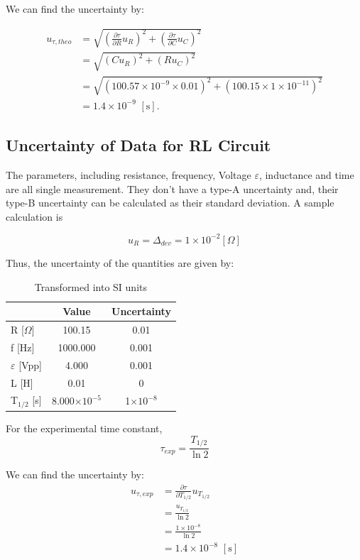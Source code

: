 \documentclass[a4paper]{article}
\begin{document}
We can find the uncertainty by:

\begin{align*}
	u_{\tau,theo}
	 & = \sqrt{(\frac{\partial \tau}{\partial R}u_R)^2+(\frac{\partial \tau}{\partial C}u_C)^2} \\
	 & = \sqrt{(Cu_R)^2 + (Ru_C)^2}                                                             \\
	 & = \sqrt{(100.57\times 10^{-9}\times 0.01)^2 + (100.15 \times1\times 10^{-11})^2}         \\
	 & = 1.4\times 10^{-9}\,\,[\text{s}].
\end{align*}

\subsection{Uncertainty of Data for RL Circuit}
The parameters, including resistance, frequency, Voltage $\varepsilon$, inductance and time are all single measurement. They don't have a type-A uncertainty and, their type-B uncertainty can be calculated as their standard deviation. A sample calculation is

$$u_{R} = \Delta_{dev} = 1\times 10^{-2} [\Omega]$$

Thus, the uncertainty of the quantities are given by:
\begin{table}[!htbp]
	\centering
	\begin{tabular}{l c c}
		\hline
		                    & Value                 & Uncertainty       \\
		\hline
		R [$\Omega$]        & 100.15                & 0.01              \\
		f [Hz]              & 1000.000              & 0.001             \\
		$\varepsilon$ [Vpp] & 4.000                 & 0.001             \\
		L [H]               & 0.01                  & 0                 \\
		T$_{1/2}$ [s]       & 8.000$\times 10^{-5}$ & 1$\times 10^{-8}$ \\
		\hline
	\end{tabular}
	\caption{Transformed into SI units}
\end{table}

For the experimental time constant,
$$\tau_{exp} = \frac{T_{1/2}}{\ln 2}$$

We can find the uncertainty by:
\begin{align*}
	u_{\tau,exp}
	 & = \frac{\partial \tau}{\partial T_{1/2}}u_{T_{1/2}} \\
	 & = \frac{u_{T_{1/2}}}{\ln 2}                         \\
	 & = \frac{1\times 10^{-8}}{\ln 2}                     \\
	 & = 1.4\times 10^{-8}\,\,[\text{s}]
\end{align*}
\end{document}
